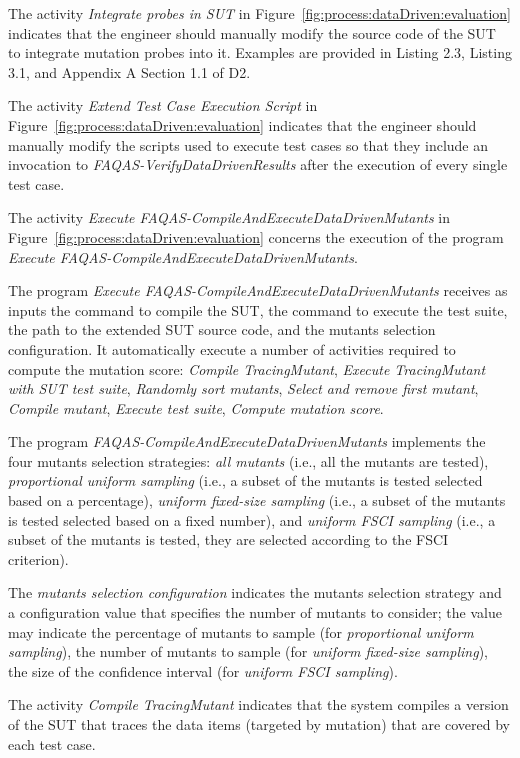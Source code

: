 \RQ{} The activity \emph{Integrate probes in SUT} in Figure~\ref{fig:process:dataDriven:evaluation} indicates that the engineer should manually modify the source code of the SUT to integrate mutation probes into it. Examples are provided in Listing 2.3, Listing 3.1, and Appendix A Section 1.1 of D2. 

\RQ{} The activity \emph{Extend Test Case Execution Script} in Figure~\ref{fig:process:dataDriven:evaluation} indicates that the engineer should manually modify the scripts used to execute test cases so that they include an invocation to \emph{FAQAS-VerifyDataDrivenResults} after the execution of every single test case. 

\RQ{} The activity \emph{Execute FAQAS-CompileAndExecuteDataDrivenMutants} in Figure~\ref{fig:process:dataDriven:evaluation} concerns the execution of the program \emph{Execute FAQAS-CompileAndExecuteDataDrivenMutants}.

\RQ{} The program \emph{Execute FAQAS-CompileAndExecuteDataDrivenMutants} receives as inputs the command to compile the SUT, the command to execute the test suite, the path to the extended SUT source code, and the mutants selection configuration. It automatically execute a number of activities required to compute the mutation score: \emph{Compile TracingMutant}, \emph{Execute TracingMutant with SUT test suite}, \emph{Randomly sort mutants}, \emph{Select and remove first mutant}, \emph{Compile mutant}, \emph{Execute test suite},  \emph{Compute mutation score}.

\RQ{} The program \emph{FAQAS-CompileAndExecuteDataDrivenMutants} implements the four mutants selection strategies: \emph{all mutants} (i.e., all the mutants are tested), \emph{proportional uniform sampling} (i.e., a subset of the mutants is tested selected based on a percentage), \emph{uniform fixed-size sampling} (i.e., a subset of the mutants is tested selected based on a fixed number), and \emph{uniform FSCI sampling} (i.e., a subset of the mutants is tested, they are selected according to the FSCI criterion).

\RQ{} The \emph{mutants selection configuration} indicates the mutants selection strategy and a configuration value that specifies the number of mutants to consider; the value may indicate the percentage of mutants to sample (for \emph{proportional uniform sampling}), the number of mutants to sample (for \emph{uniform fixed-size sampling}), the size of the confidence interval (for \emph{uniform FSCI sampling}).

\RQ{} The activity \emph{Compile TracingMutant} indicates that the system compiles a version of the SUT that traces the data items (targeted by mutation) that are covered by each test case.

